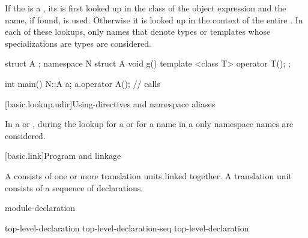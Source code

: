 \pnum
If the  is a ,
its 
is first looked up
in the class of the object expression
and the name, if
found, is used. Otherwise it is looked up in the context
of the entire .
In each of these lookups, only names that denote types or templates whose
specializations are types are considered.
\begin{example}
\begin{codeblock}
struct A { };
namespace N {
  struct A {
    void g() { }
    template <class T> operator T();
  };
}

int main() {
  N::A a;
  a.operator A();               // calls 
}
\end{codeblock}
\end{example}

[basic.lookup.udir]{Using-directives and namespace aliases}

\pnum
{}%
%
In a  or ,
during the lookup for a  or for a name in a
only namespace names are considered.%
%

[basic.link]{Program and linkage}%

\pnum
{}%
A  consists of one or more translation units
linked together. A translation unit consists
of a sequence of declarations.

\begin{bnf}
\br
    \br
     module-declaration  
\end{bnf}

\begin{bnf}
\br
     \terminal{:}  \terminal{;} 
\end{bnf}

\begin{bnf}
\br
    top-level-declaration\br
    top-level-declaration-seq top-level-declaration
\end{bnf}

